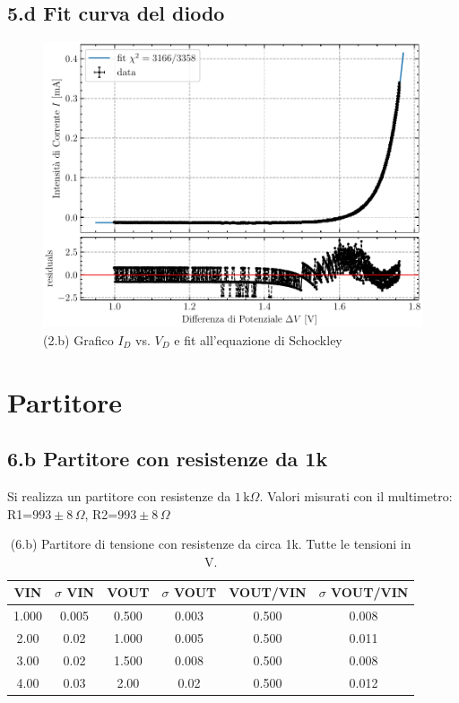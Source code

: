 \documentclass[10pt,a4paper]{article}
\begin{document}
\subsection*{5.d Fit curva del diodo}
\par

\begin{figure}[htb]
\centering
\includegraphics[scale=0.8]{ivfit}
\caption{(2.b) Grafico $I_{D}$ vs. $V_{D}$ e fit all'equazione di Schockley}
\end{figure}

\section{Partitore}

\subsection*{6.b Partitore con resistenze da 1k}

Si realizza un partitore con resistenze da $1 \,\mathrm{k}\Omega$.
Valori misurati con il multimetro: R1=$993 \pm 8 \,\Omega$,
R2=$993 \pm 8 \,\Omega$


\begin{table}[h]
\centering
\begin{tabular}{|c|c|c|c|c|c|}
\hline 
VIN& $\sigma$ VIN  & VOUT	 & $\sigma$ VOUT & VOUT/VIN & $\sigma$ VOUT/VIN \\
\hline 
1.000 & 0.005 & 0.500 & 0.003 & 0.500 & 0.008 \\
2.00 & 0.02 & 1.000 & 0.005 & 0.500 & 0.011 \\
3.00 & 0.02 & 1.500 & 0.008 & 0.500 &0.008 \\
4.00 & 0.03 & 2.00 & 0.02 & 0.500 & 0.012 \\
\hline 
\end{tabular} 
\caption{(6.b) Partitore di tensione con resistenze da circa 1k. Tutte le
tensioni in V.\label{tab:div1k}}
\end{table}
\end{document}
